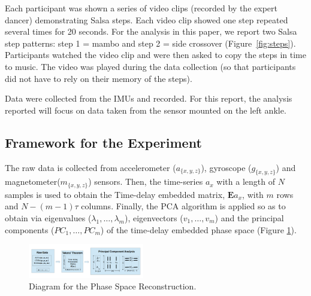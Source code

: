 \documentclass[10pt,journal,compsoc]{IEEEtran}
\begin{document}
Each participant was shown a series of video clips (recorded
by the expert dancer) demonstrating Salsa steps. Each video
clip showed one step repeated several times for 20 seconds.
For the analysis in this paper, we report two Salsa step patterns: 
step 1 = mambo and step 2 = side crossover (Figure~\ref{fig:steps}).
Participants watched the video clip and were then asked to
copy the steps in time to music. The video was played during
the data collection (so that participants did not have to rely on
their memory of the steps).

Data were collected from the IMUs and recorded. 
For this report, the analysis reported will focus on data taken from the
sensor mounted on the left ankle.




\subsection{Framework for the Experiment}
The raw data is collected from 
accelerometer ($a_{ \{ x,y,z \} }$), gyroscope ($g_{ \{ x,y,z \} }$) 
and magnetometer($m_{ \{ x,y,z \} }$) sensors. 
Then, the time-series $a_x$ with a length of $N$ samples is used to obtain 
the Time-delay embedded matrix, $\boldsymbol{E} a_{x}$, with $m$ rows and $N-(m-1)\tau$ columns. 
Finally, the PCA algorithm is applied so as to obtain via eigenvalues 
($\lambda_1,\ldots,\lambda_m$), eigenvectors ($v_1,\ldots,v_m$) and the principal components 
($PC_1,\ldots,PC_m$) of the time-delay embedded phase space (Figure \ref{fig:raw_takens_pca}).
\begin{figure}[!htb]
\centering
\includegraphics[width=0.45\textwidth]{diagram_v10}
\caption[PA]{Diagram for the Phase Space Reconstruction.}
\label{fig:raw_takens_pca}
\end{figure}
\end{document}
